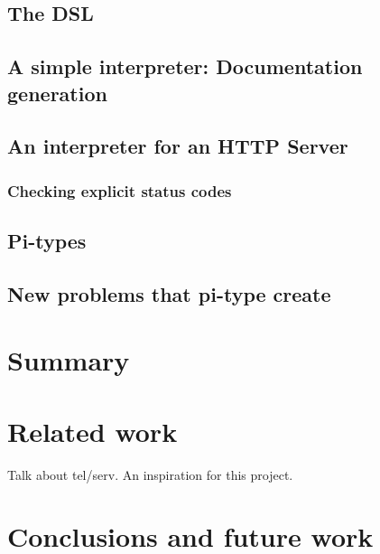 \documentclass[12pt,a4paper]{article}
\begin{document}
\subsection{The DSL}
\subsection{A simple interpreter: Documentation generation}
\subsection{An interpreter for an HTTP Server}
\subsubsection{Checking explicit status codes}
\subsection{Pi-types}
\subsection{New problems that pi-type create}

\section{Summary}
\section{Related work}
Talk about tel/serv. An inspiration for this project.
\section{Conclusions and future work}
\end{document}
